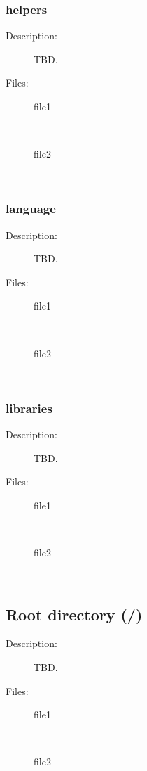 \documentclass[11pt]{article} %
\begin{document}
\subsubsection{helpers}
\begin{description}
\item[Description:] TBD.
\item[Files:] \textbf{ }
\begin{description}
\item[file1]  \textbf{ }\\
\item[file2]  \textbf{ }\\
\end{description} 
\end{description} 

\subsubsection{language}
\begin{description}
\item[Description:] TBD.
\item[Files:] \textbf{ }
\begin{description}
\item[file1]  \textbf{ }\\
\item[file2]  \textbf{ }\\
\end{description} 
\end{description} 

\subsubsection{libraries}
\begin{description}
\item[Description:] TBD.
\item[Files:] \textbf{ }
\begin{description}
\item[file1]  \textbf{ }\\
\item[file2]  \textbf{ }\\
\end{description} 
\end{description} 

\subsection{Root directory (/)}
\begin{description}
\item[Description:] TBD.
\item[Files:] \textbf{ }
\begin{description}
\item[file1]  \textbf{ }\\
\item[file2]  \textbf{ }\\
\end{description} 
\end{description} 
\end{document}

